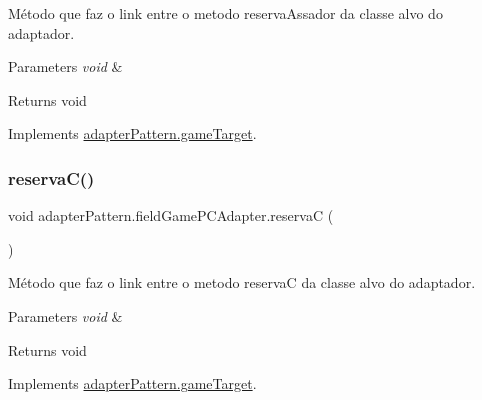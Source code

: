 Método que faz o link entre o metodo reserva\+Assador da classe alvo do adaptador. 


\begin{DoxyParams}{Parameters}
{\em void} & \\
\hline
\end{DoxyParams}
\begin{DoxyReturn}{Returns}
void 
\end{DoxyReturn}


Implements \mbox{\hyperlink{interfaceadapter_pattern_1_1game_target_a67348260f14d11e317195e2d66dbff18}{adapter\+Pattern.\+game\+Target}}.

\mbox{\label{classadapter_pattern_1_1field_game_p_c_adapter_a5867b950d86a6c3749bfed3d52fc084c}} 
\subsubsection{\texorpdfstring{reservaC()}{reservaC()}}
{\footnotesize\ttfamily void adapter\+Pattern.\+field\+Game\+P\+C\+Adapter.\+reservaC (\begin{DoxyParamCaption}{ }\end{DoxyParamCaption})}



Método que faz o link entre o metodo reservaC da classe alvo do adaptador. 


\begin{DoxyParams}{Parameters}
{\em void} & \\
\hline
\end{DoxyParams}
\begin{DoxyReturn}{Returns}
void 
\end{DoxyReturn}


Implements \mbox{\hyperlink{interfaceadapter_pattern_1_1game_target_ae8c1c944929700a3e120e641118c9188}{adapter\+Pattern.\+game\+Target}}.

\mbox{\label{classadapter_pattern_1_1field_game_p_c_adapter_ae63b5475c08a72e02d8c9c4302572a05}} 
